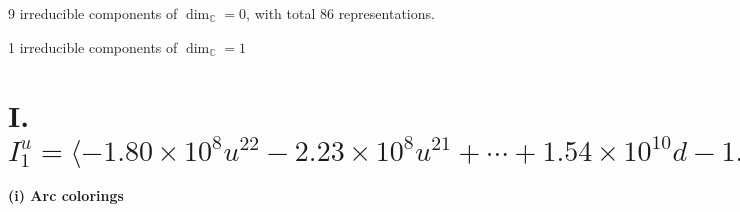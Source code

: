 \documentclass[1p]{elsarticle_modified}
\theoremstyle{definition}
\begin{document}
\raggedright * 9 irreducible components of $\dim_{\mathbb{C}}=0$, with total 86 representations.\\
\raggedright * 1 irreducible components of $\dim_{\mathbb{C}}=1$ \\
\newpage
\renewcommand{\arraystretch}{1}
\centering \section*{I. $I^u_{1}= \langle -1.80\times10^{8} u^{22}-2.23\times10^{8} u^{21}+\cdots+1.54\times10^{10} d-1.16\times10^{8},\;4.87\times10^{8} u^{22}+2.63\times10^{9} u^{21}+\cdots+1.85\times10^{11} c-1.83\times10^{11},\;6.73\times10^{9} u^{22}+1.19\times10^{10} u^{21}+\cdots+9.25\times10^{10} b+3.92\times10^{10},\;-3.21\times10^{8} u^{22}+1.29\times10^{9} u^{21}+\cdots+9.25\times10^{10} a-9.14\times10^{10},\;u^{23}+2 u^{22}+\cdots-4 u^2+8 \rangle$}
\flushleft \textbf{(i) Arc colorings}\\
\end{document}
